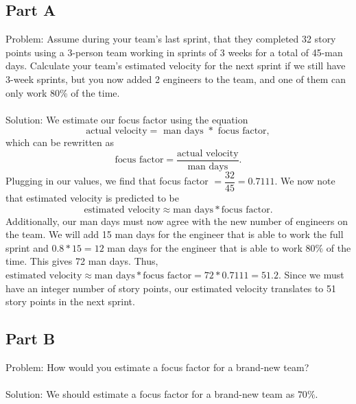 \documentclass{article}
\begin{document}
\subsection*{Part A}
Problem: Assume during your team's last sprint, that they completed 32 story points using a 3-person team working in sprints of 3 weeks for a total of 45-man days. Calculate your team's estimated velocity for the next sprint if we still have 3-week sprints, but you now added 2 engineers to the team, and one of them can only work 80\% of the time. \\\\
Solution: We estimate our focus factor using the equation
$$\text{actual velocity} = \text{ man days } * \text{ focus factor},$$
which can be rewritten as
$$\text{focus factor} = \dfrac{\text{actual velocity}}{\text{man days}}.$$
Plugging in our values, we find that focus factor
$= \dfrac{32}{45} = 0.7111$.
We now note that estimated velocity is predicted to be 
$$\text{estimated velocity} \approx \text{man days} * \text{focus factor}.$$
Additionally, our man days must now agree with the new number of engineers on the team. We will add 15 man days for the engineer that is able to work the full sprint and 
$0.8 * 15 = 12$
man days for the engineer that is able to work
$80\%$
of the time. This gives 72 man days. Thus,
$\text{estimated velocity} \approx \text{man days} * \text{focus factor} = 72 * 0.7111 = 51.2$.
Since we must have an integer number of story points, our estimated velocity translates to 51 story points in the next sprint.

\subsection*{Part B}
Problem: How would you estimate a focus factor for a brand-new team? \\\\
Solution: We should estimate a focus factor for a brand-new team as $70\%$.
\end{document}
